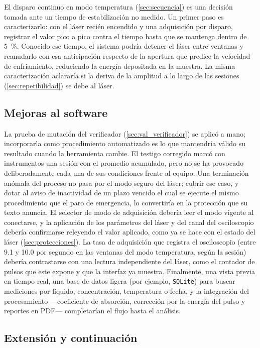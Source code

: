 El disparo continuo en modo temperatura (\cref{sec:secuencia}) es una
decisión tomada ante un tiempo de estabilización no medido. Un primer
paso es caracterizarlo: con el láser recién encendido y una adquisición
por disparo, registrar el valor pico a pico contra el tiempo hasta que
se mantenga dentro de \SI{5}{\percent}. Conocido ese tiempo, el sistema
podría detener el láser entre ventanas y reanudarlo con esa anticipación
respecto de la apertura que predice la velocidad de enfriamiento,
reduciendo la energía depositada en la muestra. La misma
caracterización aclararía si la deriva de la amplitud a lo largo de las
sesiones (\cref{sec:repetibilidad}) se debe al láser.

\subsection*{Mejoras al software}

La prueba de mutación del verificador (\cref{sec:val_verificador}) se
aplicó a mano; incorporarla como procedimiento automatizado es lo que
mantendría válido su resultado cuando la herramienta cambie. El
testigo corregido marcó con instrumentos una sesión con el promedio
acumulado, pero no se ha provocado deliberadamente cada una de sus
condiciones frente al equipo.
Una terminación anómala del proceso no pasa por el modo seguro del
láser; cubrir ese caso, y dotar al aviso de inactividad de un plazo
vencido el cual se ejecute el mismo procedimiento que el paro de
emergencia, lo convertiría en la protección que su texto anuncia. El
selector de modo de adquisición debería leer el modo vigente al
conectarse, y la aplicación de los parámetros del láser y del canal del
osciloscopio debería confirmarse releyendo el valor aplicado, como ya
se hace con el estado del láser (\cref{sec:protecciones}). La tasa de
adquisición que registra el osciloscopio
(entre 9.1 y 10.0 por segundo en las ventanas del modo temperatura,
según la sesión)
debería contrastarse con una lectura independiente del láser, como el
contador de pulsos que este expone y que la interfaz ya muestra.
Finalmente, una vista previa en tiempo real, una base de datos ligera
(por ejemplo, \texttt{SQLite}) para buscar mediciones por líquido,
concentración, temperatura o fecha, y la integración del
procesamiento ---coeficiente de absorción, corrección por la energía del
pulso y reportes en PDF--- completarían el flujo hasta el análisis.

\subsection*{Extensión y continuación}

